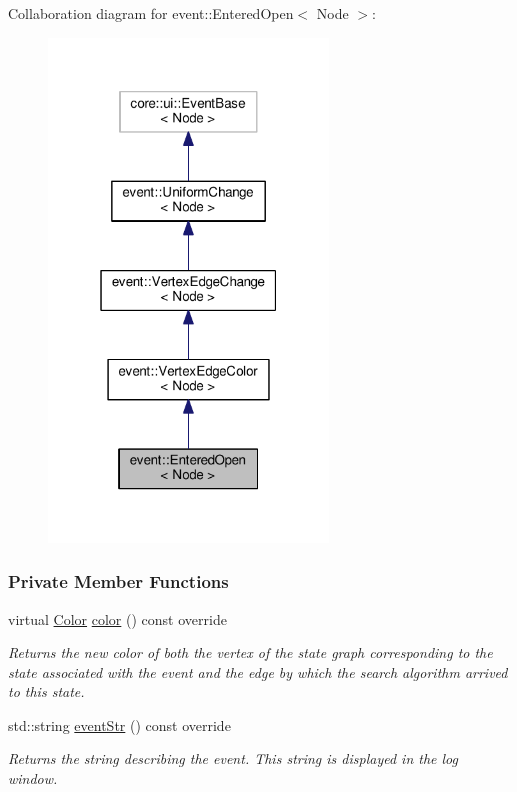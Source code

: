 Collaboration diagram for event\+:\+:Entered\+Open$<$ Node $>$\+:\nopagebreak
\begin{figure}[H]
\begin{center}
\leavevmode
\includegraphics[width=211pt]{structevent_1_1EnteredOpen__coll__graph}
\end{center}
\end{figure}
\subsubsection*{Private Member Functions}
\begin{DoxyCompactItemize}
\item 
virtual \hyperlink{colors_8h_ab87bacfdad76e61b9412d7124be44c1c}{Color} \hyperlink{structevent_1_1EnteredOpen_a248e387dece4529a5179ec42bbae0f4d}{color} () const override
\begin{DoxyCompactList}\small\item\em Returns the new color of both the vertex of the state graph corresponding to the state associated with the event and the edge by which the search algorithm arrived to this state. \end{DoxyCompactList}\item 
std\+::string \hyperlink{structevent_1_1EnteredOpen_ac847b3dc1bf2c66142e693f9bb21fa2e}{event\+Str} () const override
\begin{DoxyCompactList}\small\item\em Returns the string describing the event. This string is displayed in the log window. \end{DoxyCompactList}\end{DoxyCompactItemize}
